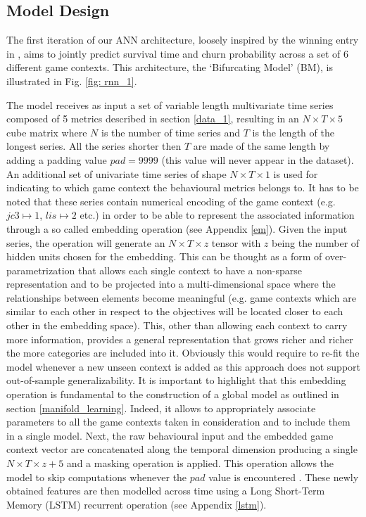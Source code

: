 \subsection{Model Design}
\label{model_design_1}
The first iteration of our ANN architecture, loosely inspired by the winning entry in \cite{lee2018game}, aims to jointly predict survival time and churn probability across a set of 6 different game contexts. This architecture, the `Bifurcating Model' (BM), is illustrated in Fig. \ref{fig: rnn_1}. 

The model receives as input a set of variable length multivariate time series composed of 5 metrics described in section \ref{data_1}, resulting in an $N \times T \times 5$ cube matrix where $N$ is the number of time series and $T$ is the length of the longest series. All the series shorter then $T$ are made of the same length by adding a padding value $pad=9999$ (this value will never appear in the dataset). An additional set of univariate time series of shape $N \times T \times 1$ is used for indicating to which game context the behavioural metrics belongs to.  It has to be noted that these series contain numerical encoding of the game context (e.g. $jc3 \mapsto 1$, $lis \mapsto 2$ etc.) in order to be able to represent the associated information through a so called embedding operation (see Appendix \ref{em}). Given the input series, the operation will generate an $N \times T \times z$  tensor with $z$ being the number of hidden units chosen for the embedding. This can be thought as a form of over-parametrization that allows each single context to have a non-sparse representation and to be projected into a multi-dimensional space where the relationships between elements become meaningful (e.g. game contexts which are similar to each other in respect to the objectives will be located closer to each other in the embedding space). This, other than allowing each context to carry more information, provides a general representation that grows richer and richer the more categories are included into it. Obviously this would require to re-fit the model whenever a new unseen context is added as this approach does not support out-of-sample generalizability. It is important to highlight that this embedding operation is fundamental to the construction of a global model as outlined in section \ref{manifold_learning}. Indeed, it allows to appropriately associate parameters to all the game contexts taken in consideration and to include them in a single model. Next, the raw behavioural input and the embedded game context vector are concatenated along the temporal dimension producing a single $N \times T \times z + 5$  and a masking operation is applied. This operation allows the model to skip computations whenever the $pad$ value is encountered \cite{chollet2015keras}. These newly obtained features are then modelled across time using a Long Short-Term Memory (LSTM) recurrent operation (see Appendix \ref{lstm}). 


